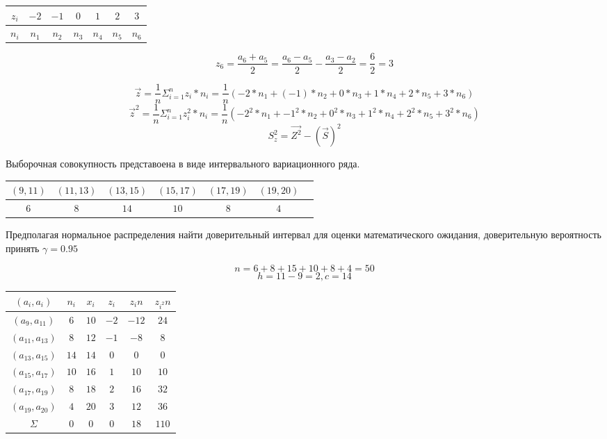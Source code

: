 \documentclass[a4paper]{article}
\begin{document}
\begin{table}[H]
    \centering
    \begin{tabular}{|c|c|c|c|c|c|c|}
        \hline
        $z_i$ & $-2$ & $-1$ & $0$ & $1$ & $2$ & $3$\\
        \hline
        $n_i$ & $n_1$ & $n_2$ & $n_3$ & $n_4$ & $n_5$ & $n_6$ \\
        \hline
    \end{tabular}
\end{table}

$$ z_6 = \frac{a_6 + a_5}{2} = \frac{a_6 - a_5}{2} - \frac{a_3 - a_2}{2} = \frac{6}{2} = 3 $$

$$ \vec{z} = \frac{1}{n}\Sigma_{i=1}^nz_i*n_i = \frac{1}{n}(-2 * n_1 + (-1)*n_2 + 0 * n_3 + 1 * n_4  + 2 * n_5  + 3 * n_6) $$
$$ \vec{z}^2 = \frac{1}{n}\Sigma_{i=1}^nz_i^2*n_i = \frac{1}{n}(-2^2 * n_1 + -1^2*n_2 + 0^2 * n_3 + 1^2 * n_4  + 2^2 * n_5  + 3^2 * n_6)$$
$$ S_z^2 = \vec{Z^2} - (\vec{S})^2$$

Выборочная совокупность представоена в виде интервального вариационного ряда.

\begin{table}[H]
    \centering
    \begin{tabular}{|c|c|c|c|c|c|c|}
        \hline
        $(9, 11)$ & $(11, 13)$ & $(13, 15)$ & $(15, 17)$ & $(17, 19)$ & $(19, 20)$ \\
        \hline
        $6$ & $8$ & $14$ & $10$ & $8$ & $4$\\
        \hline
    \end{tabular}
\end{table}

Предполагая нормальное распределения найти доверительный интервал для оценки математического ожидания, доверительную вероятность принять $\gamma = 0.95$

$$ n = 6 + 8 + 15 + 10 + 8 + 4 = 50$$
$$ h = 11-9 = 2, c = 14$$

\begin{table}[H]
    \centering
    \begin{tabular}{|c|c|c|c|c|c|}
        \hline
        $(a_i, a_i)$   & $n_i$ & $x_i$ & $z_i$ & $z_in$ & $z_{i^2}n$ \\
        \hline
        $(a_9, a_11)$  & $6$ & $10$ & $-2$ & $-12$ & $24$ \\
        $(a_11, a_13)$ & $8$ & $12$ & $-1$ & $-8$ & $8$ \\
        $(a_13, a_15)$ & $14$ & $14$ & $0$ & $0$ & $0$ \\
        $(a_15, a_17)$ & $10$ & $16$ & $1$ & $10$ & $10$ \\
        $(a_17, a_19)$ & $8$ & $18$ & $2$ & $16$ & $32$ \\
        $(a_19, a_20)$ & $4$ & $20$ & $3$ & $12$ & $36$ \\
        $\Sigma$ & $ 0 $ & $0$ & $0$ & $18$ & $110$ \\
        \hline
    \end{tabular}
\end{table}
\end{document}
